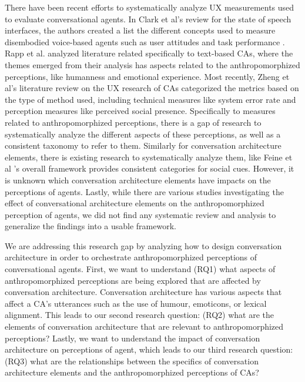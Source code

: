 \documentclass[sigconf,screen,review, anonymous]{acmart}
\begin{document}
 There have been recent efforts to systematically analyze UX measurements used to evaluate conversational agents. In Clark et al's review for the state of speech interfaces, the authors created a list the different concepts used to measure disembodied voice-based agents such as user attitudes and task performance \cite{clark2019state}. Rapp et al. \cite{rapp2021human} analyzed literature related specifically to text-based CAs, where the themes emerged from their analysis has aspects related to the anthropomorphized perceptions, like humanness and emotional experience. Most recently, Zheng et al's literature review on the UX research of CAs \cite{zheng2022ux} categorized the metrics based on the type of method used, including technical measures like system error rate and perception measures like perceived social presence. Specifically to measures related to anthropomorphized perceptions, there is a gap of research to systematically analyze the different aspects of these perceptions, as well as a consistent taxonomy to refer to them. Similarly for conversation architecture elements, there is existing research to systematically analyze them, like Feine et al \cite{feine2019taxonomy}'s overall framework provides consistent categories for social cues. However, it is unknown which conversation architecture elements have impacts on the perceptions of agents. Lastly, while there are various studies investigating the effect of  conversational architecture elements on the anthropomorphized perception of agents, we did not find any systematic review and analysis to generalize the findings into a usable framework.

We are addressing this research gap by analyzing how to design conversation architecture in order to orchestrate anthropomorphized perceptions of conversational agents. First, we want to understand (RQ1) what aspects of anthropomorphized perceptions are being explored that are affected by conversation architecture. Conversation architecture has various aspects that affect a CA's utterances such as the use of humour, emoticons, or lexical alignment. This leads to our second research question: (RQ2) what are the elements of conversation architecture that are relevant to anthropomorphized perceptions? Lastly, we want to understand the impact of conversation architecture on perceptions of agent, which leads to our third research question: (RQ3) what are the relationships between the specifics of conversation architecture elements and the anthropomorphized perceptions of CAs?
\end{document}
